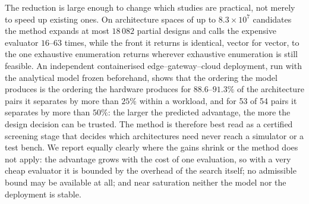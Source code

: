 \documentclass[pdflatex,sn-nature,lineno]{sn-jnl}
\newcommand{\EvalRange}{16\text{--}63}
\newcommand{\WithinAgreementRange}{88.6\text{--}91.3}
\newcommand{\MaxStates}{18\,082}
\newcommand{\ReliabilityFifty}{53 of 54}
\begin{document}
The reduction is large enough to change which studies are practical, not merely to speed up existing ones. On
architecture spaces of up to $8.3\times10^{7}$ candidates the method expands at most
$\MaxStates$ partial designs and calls the expensive evaluator $\EvalRange$ times, while the
front it returns is identical, vector for vector, to the one exhaustive enumeration
returns wherever exhaustive enumeration is still feasible. An independent containerised
edge--gateway--cloud deployment, run with the analytical model frozen beforehand, shows
that the ordering the model produces is the ordering the hardware produces for
$\WithinAgreementRange\%$ of the architecture pairs it separates by more than $25\%$
within a workload, and for \ReliabilityFifty{} pairs it separates by more than $50\%$:
the larger the predicted advantage, the more the design decision can be trusted. The
method is therefore best read as a certified screening stage that decides which
architectures need never reach a simulator or a test bench. We report equally clearly where the gains shrink or the method does not apply: the
advantage grows with the cost of one evaluation, so with a very cheap evaluator it is
bounded by the overhead of the search itself; no admissible bound may be available at
all; and near saturation neither the model nor the deployment is stable.
\end{document}
